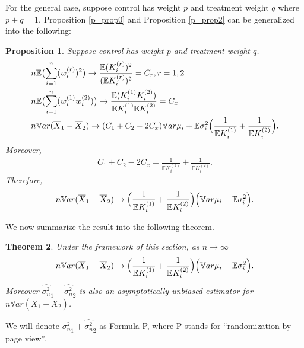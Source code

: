 \documentclass[12pt,letterpaper]{article}
\newcommand{\wht}{\widehat}
\newcommand{\var}{\ensuremath{\mathbb Var}}
\newcommand{\bbe}{\mathbb{E}}
\newcommand{\xbar}{\overline{X}}
\newcommand{\naiveest}{\wht{\sigma^2_n}}
\newtheorem{thm}{Theorem}
\newtheorem{prop}[thm]{Proposition}
\begin{document}
For the general case, suppose control has weight $p$ and treatment weight $q$ where $p+q=1$. Proposition \ref{p_prop0} and Proposition \ref{p_prop2} can be generalized into the following:
\begin{prop}\label{p_prop3}
Suppose control has weight $p$ and treatment weight $q$. 
\begin{align*}
&n\bbe \bigl (\sum_{i=1}^n (w_i^{(r)})^2\bigr)\to \frac{\bbe (K_i^{(r)})^2}{(\bbe K_i^{(r)})^2} = C_r, r=1,2\\
&n\bbe \bigl (\sum_{i=1}^n (w_i^{(1)}w_i^{(2)})\bigr)\to \frac{\bbe (K_i^{(1)}K_i^{(2)})}{\bbe K_i^{(1)}\bbe K_i^{(2)}} = C_x\\
&n\var(\xbar_1-\xbar_2) \to (C_1+C_2-2C_x) \var \mu_i + \bbe \sigma_i^2\Bigl(\frac{1 }{\bbe K_i^{(1)}}+\frac{1}{\bbe K_i^{(2)}}\Bigr).
\end{align*}
Moreover, 
\begin{align*}
C_1+C_2-2C_x = \frac{1 }{\bbe K_i^{(1)}}+\frac{1}{\bbe K_i^{(2)}}.
\end{align*}
Therefore, 
\begin{align*}
n\var(\xbar_1-\xbar_2) \to \Bigl(\frac{1 }{\bbe K_i^{(1)}}+\frac{1}{\bbe K_i^{(2)}}\Bigr) \Bigl( \var \mu_i + \bbe \sigma_i^2\Bigr).
\end{align*}
\end{prop}

We now summarize the result into the following theorem.
\begin{thm}\label{p_thm1}
Under the framework of this section, as $n\to\infty$
\begin{align*}
n\var(\xbar_1-\xbar_2) \to \Bigl(\frac{1 }{\bbe K_i^{(1)}}+\frac{1}{\bbe K_i^{(2)}}\Bigr) \Bigl( \var \mu_i + \bbe \sigma_i^2\Bigr).
\end{align*}
Moreover $\naiveest_1+\naiveest_2$ is also an asymptotically unbiased estimator for $n\var(\xbar_1-\xbar_2)$.
\end{thm}

We will denote $\naiveest_1+\naiveest_2$ as Formula P, where P stands for ``randomization by page view''.
\end{document}

